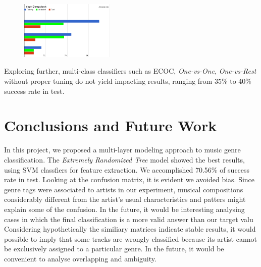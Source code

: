\documentclass[10pt,twocolumn,letterpaper]{article}
\begin{document}
\begin{figure}[H]
\centering
\includegraphics[width=0.4\textwidth]{img/ModelComparison.png}
\end{figure}

Exploring further, multi-class classifiers such as ECOC, \emph{One-vs-One},
\emph{One-vs-Rest} without proper tuning do not yield impacting results, ranging
from 35\% to 40\% success rate in test.
\section{Conclusions and Future Work}
In this project, we proposed a multi-layer modeling approach to music genre
classification. The \emph{Extremely Randomized Tree} model showed
the best results, using SVM classfiers for feature extraction. We accomplished
70.56\% of success rate in test. Looking at the confusion matrix, it is evident
we avoided bias.
Since genre tags were associated to artists in our experiment, musical
compositions considerably different from the artist's usual characteristics and
patters might explain some of the confusion. In the future, it would be interesting analysing
cases in which the final classification is a more valid answer than our target
valu
Considering hypothetically the similiary matrices indicate stable results, it
would possible to imply that some tracks are wrongly classified because its
artist cannot be exclusively assigned to a particular genre. In the future, it
would be convenient to analyse overlapping and ambiguity.


{\small


}

%

%

%
\end{document}
